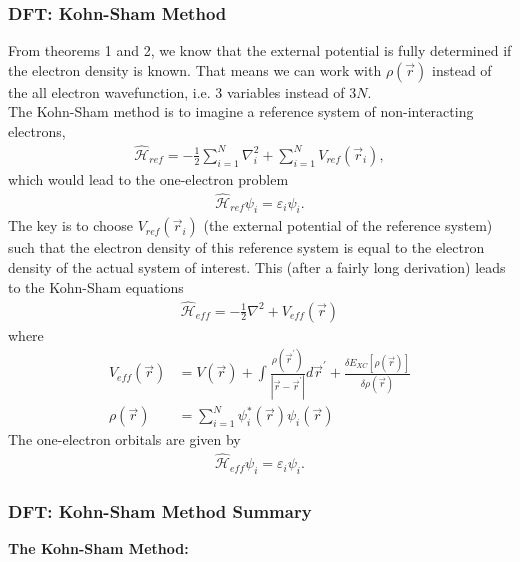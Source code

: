 \documentclass{beamer}
\newcommand{\Ham}{\widehat{\mathcal{H}}}
\newcommand{\vri}{\vec{r}_{i}}
\newcommand{\rhovr}{\rho(\vec{r})}
\newenvironment{noheadline}{
	\setbeamertemplate{headline}{}
	\addtobeamertemplate{frametitle}{\vspace*{-0.9\baselineskip}}{}
}{}
\begin{document}
\begin{noheadline}
\begin{frame}
\frametitle{DFT: Kohn-Sham Method}
{\tiny
	From theorems 1 and 2, we know that the external potential is fully determined if the electron density is known. That means we can work with $\rhovr$ instead of the all electron wavefunction, i.e. 3 variables instead of $3N$.\\
	The Kohn-Sham method is to imagine a reference system of non-interacting electrons,
	\begin{align*}
	\Ham_{ref} = -\frac{1}{2}\sum_{i=1}^{N} \nabla^{2}_{i} + \sum_{i=1}^{N} V_{ref}(\vri),
	\end{align*}
	which would lead to the one-electron problem
	\begin{align*}
	\Ham_{ref}\psi_{i} = \varepsilon_{i}\psi_{i}.
	\end{align*}
	The key is to choose $V_{ref}(\vri)$ (the external potential of the reference system) such that the electron density of this reference system is equal to the electron density of the actual system of interest. This (after a fairly long derivation) leads to the Kohn-Sham equations
	\begin{align*}
	\Ham_{eff} = -\frac{1}{2} \nabla^{2} + V_{eff} (\vec{r})
	\end{align*}
	where
	\begin{align*}
	V_{eff} (\vec{r}) &= V (\vec{r}) + \int \frac{\rho (\vec{r}^{\prime})}{|\vec{r} - \vec{r}^{\prime} |} d\vec{r}^{\prime} + \frac{\delta E_{XC}[\rhovr]}{\delta \rhovr}\\
	\rhovr &= \sum_{i=1}^{N} \psi_{i}^{*}(\vec{r}) \psi_{i}(\vec{r}) 
	\end{align*}
	The one-electron orbitals are given by
	\begin{align*}
	\Ham_{eff}\psi_{i} = \varepsilon_{i}\psi_{i}.
	\end{align*}
}
\end{frame}

\begin{frame}
\frametitle{DFT: Kohn-Sham Method Summary}
{\tiny
	\textbf{The Kohn-Sham Method:}\\
	
}
\end{frame}
\end{noheadline}
\end{document}
